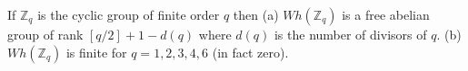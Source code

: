 If $\mathbb{Z}_q$ is the cyclic group of finite order $q$ then
(a) $Wh(\mathbb{Z}_q)$ is a free abelian group of rank $[q/2] + 1 - d(q)$ where $d(q)$ is the number of divisors of $q$.
(b) $Wh(\mathbb{Z}_q)$ is finite for $q = 1, 2, 3, 4, 6$ (in fact zero).
